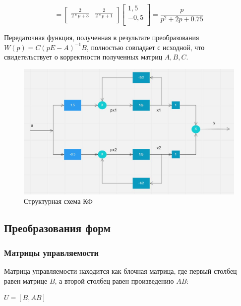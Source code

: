 \documentclass[14pt,a4paper,report]{report}
\begin{document}
\begin{equation*}
\text{$=\begin{bmatrix}
	\frac{2}{2*p + 3} & \frac{2}{2*p + 1} \\
	\end{bmatrix}\begin{bmatrix}
	1,5 \\
	-0,5 \\
	\end{bmatrix}=\frac{p}{p^2+2p+0.75}
	$}
\end{equation*}

Передаточная функция, полученная в результате преобразования $W(p)=C(pE-A)^{-1}B$, полностью совпадает с исходной, что свидетельствует о корректности полученных матриц  $A, B, C$. 


\begin{figure}[h!]
	\centering
	\includegraphics[scale = 0.6]{images/kf.jpg}
	\caption{Структурная схема КФ}
	\label{image:3}
\end{figure}

\subsection{Преобразования форм}

\subsubsection{Матрицы управляемости}

Матрица управляемости находится как блочная матрица, где первый столбец равен матрице $B$, а второй столбец равен произведению $AB$:

\begin{center}
$U=[B, AB]$
\end{center}
\end{document}
